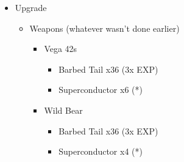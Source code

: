 	\begin{upgrade}
		\begin{itemize}
			\item Upgrade
			      \begin{itemize}
				      \item Weapons (whatever wasn't done earlier)
				            \begin{itemize}
					            \item Vega 42s
					                  \begin{itemize}
						                  \item Barbed Tail x36 (3x EXP)
						                  \item Superconductor x6 (*)
					                  \end{itemize}
					            \item Wild Bear
					                  \begin{itemize}
						                  \item Barbed Tail x36 (3x EXP)
						                  \item Superconductor x4 (*)
					                  \end{itemize}


\end{itemize}
\end{itemize}
\end{itemize}
\end{upgrade}
